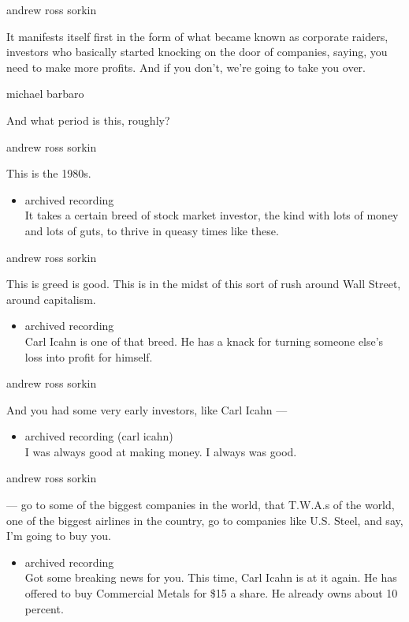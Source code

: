 andrew ross sorkin

It manifests itself first in the form of what became known as corporate
raiders, investors who basically started knocking on the door of
companies, saying, you need to make more profits. And if you don't,
we're going to take you over.

michael barbaro

And what period is this, roughly?

andrew ross sorkin

This is the 1980s.

\begin{itemize}
\tightlist
\item
  archived recording\\
  It takes a certain breed of stock market investor, the kind with lots
  of money and lots of guts, to thrive in queasy times like these.
\end{itemize}

andrew ross sorkin

This is greed is good. This is in the midst of this sort of rush around
Wall Street, around capitalism.

\begin{itemize}
\tightlist
\item
  archived recording\\
  Carl Icahn is one of that breed. He has a knack for turning someone
  else's loss into profit for himself.
\end{itemize}

andrew ross sorkin

And you had some very early investors, like Carl Icahn ---

\begin{itemize}
\tightlist
\item
  archived recording (carl icahn)\\
  I was always good at making money. I always was good.
\end{itemize}

andrew ross sorkin

--- go to some of the biggest companies in the world, that T.W.A.s of
the world, one of the biggest airlines in the country, go to companies
like U.S. Steel, and say, I'm going to buy you.

\begin{itemize}
\tightlist
\item
  archived recording\\
  Got some breaking news for you. This time, Carl Icahn is at it again.
  He has offered to buy Commercial Metals for \$15 a share. He already
  owns about 10 percent.
\end{itemize}


